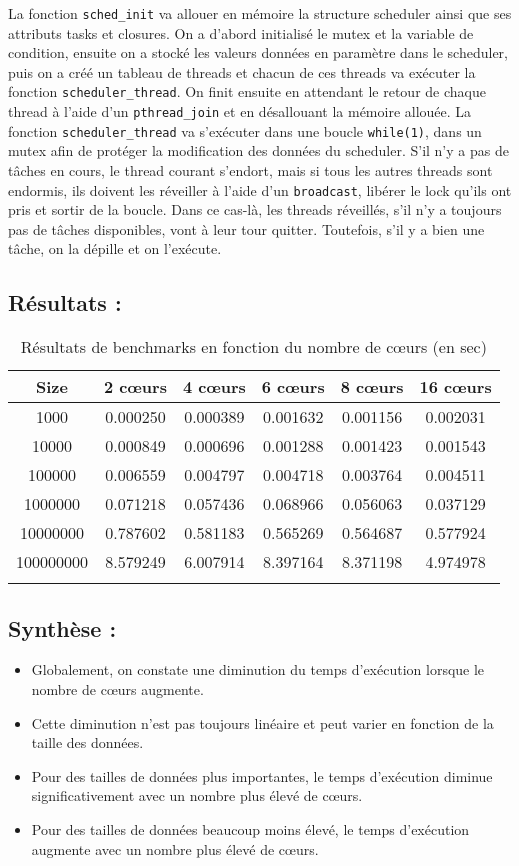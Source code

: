 \documentclass{article}
\begin{document}
	La fonction \texttt{sched\_init} va allouer en mémoire la structure scheduler ainsi que ses attributs tasks et closures. On a d’abord initialisé le mutex et la variable de condition, ensuite on a stocké les valeurs données en paramètre dans le scheduler, puis on a créé un tableau de threads et chacun de ces threads va exécuter la fonction \texttt{scheduler\_thread}. On finit ensuite en attendant le retour de chaque thread à l’aide d’un \texttt{pthread\_join} et en désallouant la mémoire allouée. La fonction \texttt{scheduler\_thread} va s’exécuter dans une boucle \texttt{while(1)}, dans un mutex afin de protéger la modification des données du scheduler. S’il n’y a pas de tâches en cours, le thread courant s’endort, mais si tous les autres threads sont endormis, ils doivent les réveiller à l’aide d’un \texttt{broadcast}, libérer le lock qu’ils ont pris et sortir de la boucle. Dans ce cas-là, les threads réveillés, s’il n’y a toujours pas de tâches disponibles, vont à leur tour quitter. Toutefois, s’il y a bien une tâche, on la dépille et on l’exécute.
	
	\subsection*{Résultats :}
	
	\begin{longtable}{|c|c|c|c|c|c|}
		\hline
		\textbf{Size} & \textbf{2 cœurs} & \textbf{4 cœurs} & \textbf{6 cœurs} & \textbf{8 cœurs} & \textbf{16 cœurs} \\
		\hline
		1000 & 0.000250 & 0.000389 & 0.001632 & 0.001156 & 0.002031 \\
		10000 & 0.000849 & 0.000696 & 0.001288 & 0.001423 & 0.001543 \\
		100000 & 0.006559 & 0.004797 & 0.004718 & 0.003764 & 0.004511 \\
		1000000 & 0.071218 & 0.057436 & 0.068966 & 0.056063 & 0.037129 \\
		10000000 & 0.787602 & 0.581183 & 0.565269 & 0.564687 & 0.577924 \\
		100000000 & 8.579249 & 6.007914 & 8.397164 & 8.371198 & 4.974978 \\
		\hline
		\caption{Résultats de benchmarks en fonction du nombre de cœurs (en sec)}
	\end{longtable}
	
	\subsection*{Synthèse :}
	
	\begin{itemize}
		\item Globalement, on constate une diminution du temps d'exécution lorsque le nombre de cœurs augmente.
		\item Cette diminution n'est pas toujours linéaire et peut varier en fonction de la taille des données.
		\item Pour des tailles de données plus importantes, le temps d'exécution diminue significativement avec un nombre plus élevé de cœurs.
		\item Pour des tailles de données beaucoup moins élevé, le temps d'exécution augmente avec un nombre plus élevé de cœurs.
	\end{itemize}
	
\end{document}
